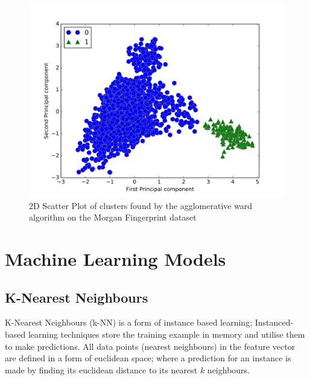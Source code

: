 \documentclass[a4paper,12pt]{report}
\begin{document}
			\begin{figure}[H]
				\centering
				\includegraphics[width=\textwidth,scale=1,totalheight=0.4\textheight]{images/agg_morgan_scatter}
				\caption{2D Scatter Plot of clusters found by the agglomerative ward algorithm on the Morgan Fingerprint dataset}
				\label{fig:agg_morgan_scatter}
			\end{figure}
			



	\section{Machine Learning Models}
		\subsection{K-Nearest Neighbours}
		K-Nearest Neighbours (k-NN) is a form of instance based learning; Instanced-based learning techniques store the training example in memory and utilise them to make predictions. All data points (nearest neighbours) in the feature vector are defined in a form of euclidean space; where a prediction for an instance is made by finding its euclidean distance to its nearest $k$ neighbours. 
		
\end{document}
